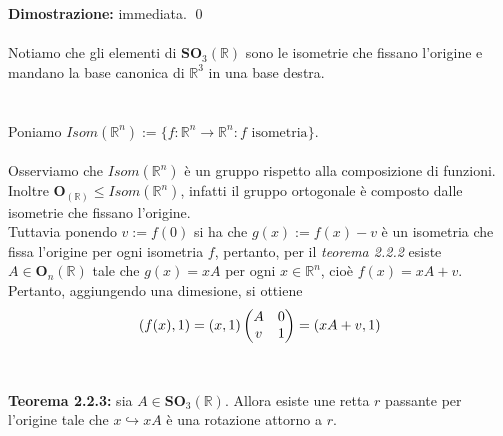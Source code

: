 \documentclass{article}
\begin{document}
\textbf{Dimostrazione:} immediata. \qed \\ \\
Notiamo che gli elementi di $\mathbf{SO}_3(\mathbb{R})$ sono le isometrie che fissano l'origine e mandano la base canonica di $\mathbb{R}^3$ in una base destra. \\ \\ \\
Poniamo $Isom(\mathbb{R}^n) := \{ f : \mathbb{R}^n \longrightarrow \mathbb{R}^n : f \text{ isometria} \}$. \\ \\
Osserviamo che $Isom(\mathbb{R}^n)$ è un gruppo rispetto alla composizione di funzioni. Inoltre $\mathbf{O}_(\mathbb{R}) \leq Isom(\mathbb{R}^n)$, infatti il gruppo ortogonale è composto dalle isometrie che fissano l'origine.  \\
Tuttavia ponendo $v := f(0)$ si ha che $g(x) := f(x) - v$ è un isometria che fissa l'origine per ogni isometria $f$, pertanto, per il \textit{teorema 2.2.2} esiste $A \in \mathbf{O}_n(\mathbb{R})$ tale che $g(x) = xA$ per ogni $x \in \mathbb{R}^n$, cioè $f(x) = xA + v$. \\
Pertanto, aggiungendo una dimesione, si ottiene
\begin{gather}
    (f(x), 1) = (x, 1) \begin{pmatrix}
        A & 0 \\
        v & 1 
    \end{pmatrix}
    = (xA + v, 1) \notag
\end{gather} \\ \\
\textbf{Teorema 2.2.3:} sia $A \in \mathbf{SO}_3(\mathbb{R})$. Allora esiste une retta $r$ passante per l'origine tale che $x \hookrightarrow xA$ è una rotazione attorno a $r$. \\
\end{document}
